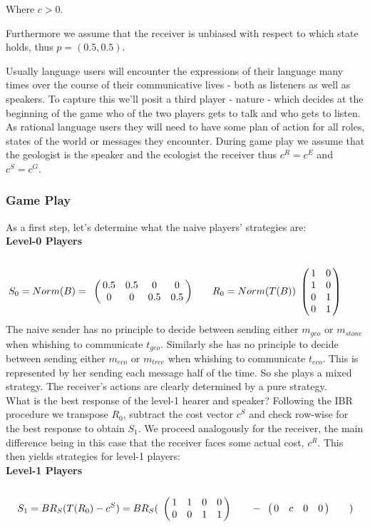 \documentclass[10]{article}
\begin{document}
Where $c>0$.

Furthermore we assume that the receiver is unbiased with respect to which state holds, thus $p=(0.5,0.5)$.

Usually language users will encounter the expressions of their language many times over the course of their communicative lives - both as listeners as well as speakers. To capture this we'll posit a third player - nature - which decides at the beginning of the game who of the two players gets to talk and who gets to listen. As rational language users they will need to have some plan of action for all roles, states of the world or messages they encounter. During game play we assume that the geologist is the speaker and the ecologist the receiver thus $c^R=c^E$ and $c^S=c^G$.

\subsubsection{Game Play}
As a first step, let's determine what the naive players' strategies are:\\
\textbf{Level-0 Players}\\
\begin{equation*}
S_0=Norm(B)=
\bordermatrix{
            & & & &    \cr
 &       0.5 &         0.5 & 0       & 0 \cr
 &       0 &         0 & 0.5       & 0.5
 }\qquad
R_0=Norm(T(B))
\bordermatrix{
            &  & \cr
    & 1 & 0 \cr
     & 1 & 0 \cr
     & 0 & 1 \cr
     & 0 & 1 \cr
 }\qquad
\end{equation*}
The naive sender has no principle to decide between sending either $m_{geo}$ or $m_{stone}$ when whishing to communicate $t_{geo}$. Similarly she has no principle to decide between sending either $m_{eco}$ or $m_{tree}$ when whishing to communicate $t_{eco}$. This is represented by her sending each message half of the time. So she plays a mixed strategy. The receiver's actions are clearly determined by a pure strategy.\\
What is the best response of the level-1 hearer and speaker? Following the IBR procedure we transpose $R_0$, subtract the cost vector $c^S$ and check row-wise for the best response to obtain $S_1$. We proceed analogously for the receiver, the main difference being in this case that the receiver faces some actual cost, $c^R$. This then yields strategies for level-1 players:\\ %
\textbf{Level-1 Players}\\
\begin{equation*}
S_1= BR_S(T(R_0)-c^S)=
BR_S(
\bordermatrix{
            & & & &    \cr
 &       1 &         1 & 0       & 0 \cr
 &       0 &         0 & 1      & 1
 }\qquad
-
\bordermatrix{
            & & & &    \cr
 &       0 &         c & 0       & 0 \cr
 }\qquad
)
\end{equation*}
\end{document}
